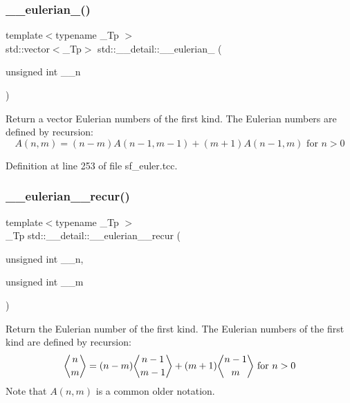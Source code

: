 \subsubsection{\texorpdfstring{\+\_\+\+\_\+eulerian\+\_()}{\_\_eulerian\_1()}\hspace{0.1cm}{\footnotesize\ttfamily [2/2]}}
{\footnotesize\ttfamily template$<$typename \+\_\+\+Tp $>$ \\
std\+::vector$<$\+\_\+\+Tp$>$ std\+::\+\_\+\+\_\+detail\+::\+\_\+\+\_\+eulerian\+\_ (\begin{DoxyParamCaption}\item[{unsigned int}]{\+\_\+\+\_\+n }\end{DoxyParamCaption})\hspace{0.3cm}{\ttfamily [inline]}}

Return a vector Eulerian numbers of the first kind. The Eulerian numbers are defined by recursion\+: \[ A(n,m) = (n-m)A(n-1,m-1) + (m+1)A(n-1,m) \mbox{ for } n > 0 \] 

Definition at line 253 of file sf\+\_\+euler.\+tcc.

\mbox{\label{namespacestd_1_1____detail_afab99319465d188432fa8357d65129e0}} 
\subsubsection{\texorpdfstring{\+\_\+\+\_\+eulerian\+\_\+\_\+recur()}{\_\_eulerian\_1\_recur()}\hspace{0.1cm}{\footnotesize\ttfamily [1/2]}}
{\footnotesize\ttfamily template$<$typename \+\_\+\+Tp $>$ \\
\+\_\+\+Tp std\+::\+\_\+\+\_\+detail\+::\+\_\+\+\_\+eulerian\+\_\+\_\+recur (\begin{DoxyParamCaption}\item[{unsigned int}]{\+\_\+\+\_\+n,  }\item[{unsigned int}]{\+\_\+\+\_\+m }\end{DoxyParamCaption})}

Return the Eulerian number of the first kind. The Eulerian numbers of the first kind are defined by recursion\+: \[ \genfrac{\langle}{\rangle}{0pt}{0}{n}{m} = (n-m)\genfrac{\langle}{\rangle}{0pt}{0}{n-1}{m-1} + (m+1)\genfrac{\langle}{\rangle}{0pt}{0}{n-1}{m} \mbox{ for } n > 0 \] Note that $ A(n,m) $ is a common older notation. 

